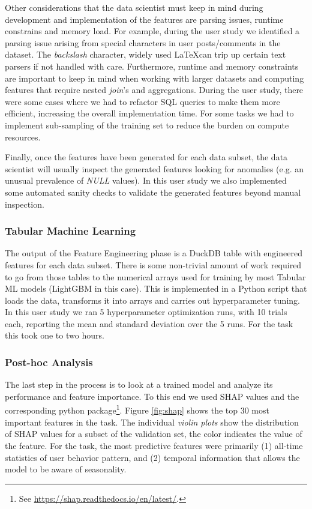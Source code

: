 Other considerations that the data scientist must keep in mind during development and implementation of the features are parsing issues, runtime constrains and memory load. For example, during the user study we identified a parsing issue arising from special characters in user posts/comments in the \stackex dataset. The \textit{backslash} character, widely used \LaTeX can trip up certain text parsers if not handled with care. Furthermore, runtime and memory constraints are important to keep in mind when working with larger datasets and computing features that require nested \textit{join}'s and aggregations. During the user study, there were some cases where we had to refactor SQL queries to make them more efficient, increasing the overall implementation time. For some tasks we had to implement sub-sampling of the training set to reduce the burden on compute resources.

Finally, once the features have been generated for each data subset, the data scientist will usually inspect the generated features looking for anomalies (e.g. an unusual prevalence of \textit{NULL} values). In this user study we also implemented some automated sanity checks to validate the generated features beyond manual inspection.

\subsubsection{Tabular Machine Learning}

The output of the Feature Engineering phase is a DuckDB table with engineered features for each data subset. There is some non-trivial amount of work required to go from those tables to the numerical arrays used for training by most Tabular ML models (LightGBM in this case). This is implemented in a Python script that loads the data, transforms it into arrays and carries out hyperparameter tuning. In this user study we ran 5 hyperparameter optimization runs, with 10 trials each, reporting the mean and standard deviation over the 5 runs. For the \userChurn task this took one to two hours.

\subsubsection{Post-hoc Analysis}

The last step in the process is to look at a trained model and analyze its performance and feature importance. To this end we used SHAP values \citep{lundberg2017unified} and the corresponding python package\footnote{See \url{https://shap.readthedocs.io/en/latest/}.}. Figure \ref{fig:shap} shows the top 30 most important features in the \userChurn task. The individual \textit{violin plots} show the distribution of SHAP values for a subset of the validation set, the color indicates the value of the feature. For the \userChurn task, the most predictive features were primarily (1) all-time statistics of user behavior pattern, and (2) temporal information that allows the model to be aware of seasonality. 


